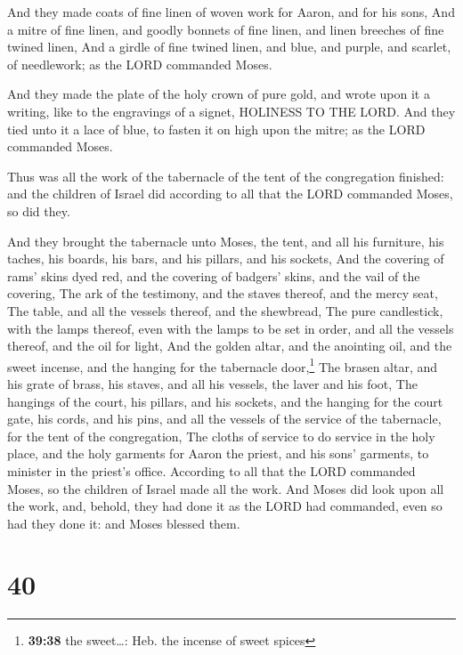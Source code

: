  And they made coats of fine linen of woven work for
Aaron, and for his sons,  And a mitre of fine linen, and
goodly bonnets of fine linen, and linen breeches of fine twined linen,
 And a girdle of fine twined linen, and blue, and purple,
and scarlet, of needlework; as the LORD commanded Moses.

 And they made the plate of the holy crown of pure gold,
and wrote upon it a writing, like to the engravings of a signet,
HOLINESS TO THE LORD.  And they tied unto it a lace of
blue, to fasten it on high upon the mitre; as the LORD commanded Moses.

 Thus was all the work of the tabernacle of the tent of
the congregation finished: and the children of Israel did according to
all that the LORD commanded Moses, so did they.

 And they brought the tabernacle unto Moses, the tent,
and all his furniture, his taches, his boards, his bars, and his
pillars, and his sockets,  And the covering of rams'
skins dyed red, and the covering of badgers' skins, and the vail of the
covering,  The ark of the testimony, and the staves
thereof, and the mercy seat,  The table, and all the
vessels thereof, and the shewbread,  The pure
candlestick, with the lamps thereof, even with the lamps to be set in
order, and all the vessels thereof, and the oil for light,
 And the golden altar, and the anointing oil, and the
sweet incense, and the hanging for the tabernacle door,\footnote{\textbf{39:38}
  the sweet\ldots: Heb. the incense of sweet spices}  The
brasen altar, and his grate of brass, his staves, and all his vessels,
the laver and his foot,  The hangings of the court, his
pillars, and his sockets, and the hanging for the court gate, his cords,
and his pins, and all the vessels of the service of the tabernacle, for
the tent of the congregation,  The cloths of service to
do service in the holy place, and the holy garments for Aaron the
priest, and his sons' garments, to minister in the priest's office.
 According to all that the LORD commanded Moses, so the
children of Israel made all the work.  And Moses did look
upon all the work, and, behold, they had done it as the LORD had
commanded, even so had they done it: and Moses blessed them.

\hypertarget{section-39}{%
\section{40}\label{section-39}}

